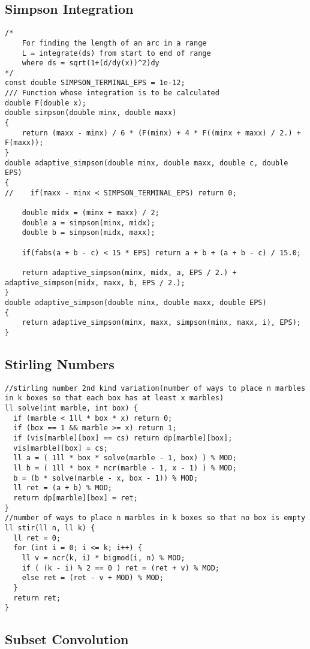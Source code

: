 \documentclass[10pt,a4paper,onesided]{article}
\begin{document}
\begin{multicols*}{3}
\subsection{Simpson Integration}
\begin{lstlisting}
/*
    For finding the length of an arc in a range
    L = integrate(ds) from start to end of range
    where ds = sqrt(1+(d/dy(x))^2)dy
*/
const double SIMPSON_TERMINAL_EPS = 1e-12;
/// Function whose integration is to be calculated
double F(double x);
double simpson(double minx, double maxx)
{
    return (maxx - minx) / 6 * (F(minx) + 4 * F((minx + maxx) / 2.) + F(maxx));
}
double adaptive_simpson(double minx, double maxx, double c, double EPS)
{
//    if(maxx - minx < SIMPSON_TERMINAL_EPS) return 0;

    double midx = (minx + maxx) / 2;
    double a = simpson(minx, midx);
    double b = simpson(midx, maxx);

    if(fabs(a + b - c) < 15 * EPS) return a + b + (a + b - c) / 15.0;

    return adaptive_simpson(minx, midx, a, EPS / 2.) + adaptive_simpson(midx, maxx, b, EPS / 2.);
}
double adaptive_simpson(double minx, double maxx, double EPS)
{
    return adaptive_simpson(minx, maxx, simpson(minx, maxx, i), EPS);
}

\end{lstlisting}
\subsection{Stirling Numbers}
\begin{lstlisting}
//stirling number 2nd kind variation(number of ways to place n marbles in k boxes so that each box has at least x marbles)
ll solve(int marble, int box) {
  if (marble < 1ll * box * x) return 0;
  if (box == 1 && marble >= x) return 1;
  if (vis[marble][box] == cs) return dp[marble][box];
  vis[marble][box] = cs;
  ll a = ( 1ll * box * solve(marble - 1, box) ) % MOD;
  ll b = ( 1ll * box * ncr(marble - 1, x - 1) ) % MOD;
  b = (b * solve(marble - x, box - 1)) % MOD;
  ll ret = (a + b) % MOD;
  return dp[marble][box] = ret;
}
//number of ways to place n marbles in k boxes so that no box is empty
ll stir(ll n, ll k) {
  ll ret = 0;
  for (int i = 0; i <= k; i++) {
    ll v = ncr(k, i) * bigmod(i, n) % MOD;
    if ( (k - i) % 2 == 0 ) ret = (ret + v) % MOD;
    else ret = (ret - v + MOD) % MOD;
  }
  return ret;
}
\end{lstlisting}
\subsection{Subset Convolution}
\begin{lstlisting}


\end{lstlisting}
\end{multicols*}
\end{document}
